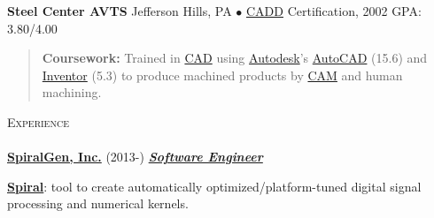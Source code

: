 \documentclass{article}
\newcommand{\area}[2]{\vspace*{-9pt} \begin{verse}\textbf{#1}   #2 \end{verse}  }
\newcommand{\lineunder}{\vspace*{-8pt} \\ \hspace*{-18pt} \hrulefill \\}
\newcommand{\header}[1]{{\hspace*{-15pt}\vspace*{6pt} \textsc{#1}} \vspace*{-6pt} \lineunder}
\newcommand{\employer}[3]{{ \textbf{#1} (#2) \underline{\textbf{\emph{#3}}}\\  }}
\newcommand{\schoolwithcourses}[3]{
 \textbf{#1} #2 $\bullet$ #3\\ 
\vspace*{5pt}
}
\begin{document}
\schoolwithcourses{Steel Center AVTS}{Jefferson Hills, PA}{\href{http://en.wikipedia.org/wiki/Computer-aided_design}{CADD} Certification, 2002 GPA: 3.80/4.00}
\area{
Coursework: }
{Trained in \href{http://en.wikipedia.org/wiki/Computer-aided_design}{CAD} using \href{http://www.autodesk.com/}{Autodesk}'s \href{http://www.autodesk.com/products/autocad/overview}{AutoCAD} (15.6) and \href{http://www.autodesk.com/products/autodesk-inventor-family/overview}{Inventor} (5.3) 
to produce machined products by \href{http://en.wikipedia.org/wiki/Computer-aided_manufacturing}{CAM} and human machining.  }

\header{Experience}

\employer{\href{http://spiralgen.com/}{SpiralGen, Inc.}}{2013-}{Software Engineer}

\textbf{\href{http://spiral.net/}{Spiral}}: tool to create automatically optimized/platform-tuned digital signal processing and numerical kernels.
\end{document}
